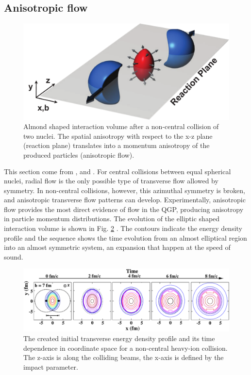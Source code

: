 \documentclass[12pt,a4paper]{book}
\begin{document}
	\subsection{Anisotropic flow}
	\begin{figure}[ht]
		\centering
		\includegraphics[width=0.8\linewidth]{pictures/elliptic_flow_collision.pdf}
		\caption{Almond shaped interaction volume after a non-central collision of two nuclei. The spatial anisotropy with respect to the x-z plane (reaction plane) translates into a momentum anisotropy of the produced particles (anisotropic flow).}
		\label{fig:elliptic_flow_collision} 
	\end{figure}
	This section come from \cite{Snellings_2011}, \cite{heinz2004conceptsheavyionphysics} and \cite{Kolb_2000}. 
	For central collisions between equal spherical nuclei, radial flow is the only possible type of transverse flow allowed by symmetry. In non-central collisions, however, this azimuthal symmetry is broken, and anisotropic transverse flow patterns can develop. Experimentally, anisotropic flow provides the most direct evidence of flow in the QGP, producing anisotropy in particle momentum distributions. The evolution of the elliptic shaped interaction volume is shown in Fig. \ref{fig:time_evolution_perepheral} \cite{kolb2003hydrodynamicdescriptionultrarelativisticheavyion}. The contours indicate the energy density profile and the sequence shows the time evolution from an almost elliptical region into an almost symmetric system, an expansion that happen at the speed of sound. 
	\begin{figure}[ht]
		\centering
		\includegraphics[width=0.8\linewidth]{pictures/timeEvolutionPerepheral.pdf}
		\caption{The created initial transverse energy density profile and its time dependence in coordinate space for a non-central heavy-ion collision. The z-axis is along the colliding beams, the x-axis is defined by the impact parameter.}
		\label{fig:time_evolution_perepheral} 
	\end{figure}
\end{document}
